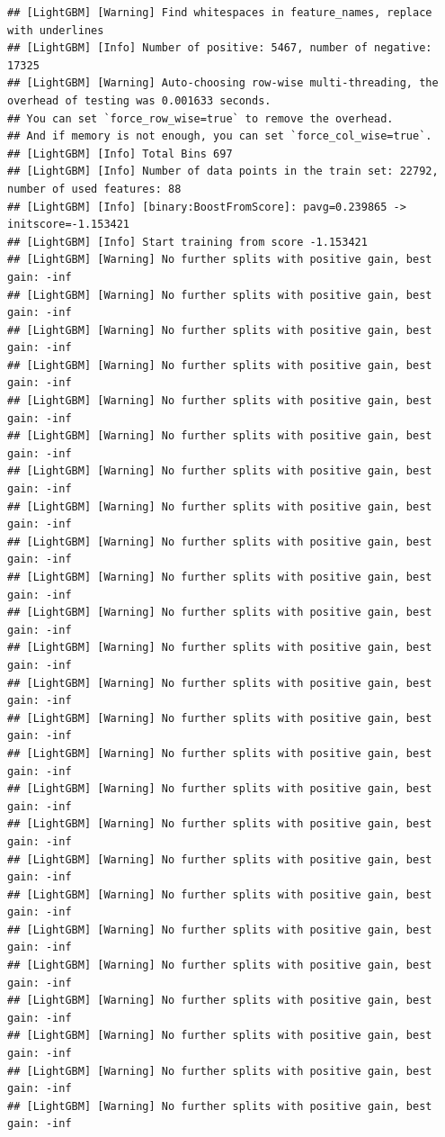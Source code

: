 \documentclass[
]{book}
\begin{document}
\begin{verbatim}
## [LightGBM] [Warning] Find whitespaces in feature_names, replace with underlines
## [LightGBM] [Info] Number of positive: 5467, number of negative: 17325
## [LightGBM] [Warning] Auto-choosing row-wise multi-threading, the overhead of testing was 0.001633 seconds.
## You can set `force_row_wise=true` to remove the overhead.
## And if memory is not enough, you can set `force_col_wise=true`.
## [LightGBM] [Info] Total Bins 697
## [LightGBM] [Info] Number of data points in the train set: 22792, number of used features: 88
## [LightGBM] [Info] [binary:BoostFromScore]: pavg=0.239865 -> initscore=-1.153421
## [LightGBM] [Info] Start training from score -1.153421
## [LightGBM] [Warning] No further splits with positive gain, best gain: -inf
## [LightGBM] [Warning] No further splits with positive gain, best gain: -inf
## [LightGBM] [Warning] No further splits with positive gain, best gain: -inf
## [LightGBM] [Warning] No further splits with positive gain, best gain: -inf
## [LightGBM] [Warning] No further splits with positive gain, best gain: -inf
## [LightGBM] [Warning] No further splits with positive gain, best gain: -inf
## [LightGBM] [Warning] No further splits with positive gain, best gain: -inf
## [LightGBM] [Warning] No further splits with positive gain, best gain: -inf
## [LightGBM] [Warning] No further splits with positive gain, best gain: -inf
## [LightGBM] [Warning] No further splits with positive gain, best gain: -inf
## [LightGBM] [Warning] No further splits with positive gain, best gain: -inf
## [LightGBM] [Warning] No further splits with positive gain, best gain: -inf
## [LightGBM] [Warning] No further splits with positive gain, best gain: -inf
## [LightGBM] [Warning] No further splits with positive gain, best gain: -inf
## [LightGBM] [Warning] No further splits with positive gain, best gain: -inf
## [LightGBM] [Warning] No further splits with positive gain, best gain: -inf
## [LightGBM] [Warning] No further splits with positive gain, best gain: -inf
## [LightGBM] [Warning] No further splits with positive gain, best gain: -inf
## [LightGBM] [Warning] No further splits with positive gain, best gain: -inf
## [LightGBM] [Warning] No further splits with positive gain, best gain: -inf
## [LightGBM] [Warning] No further splits with positive gain, best gain: -inf
## [LightGBM] [Warning] No further splits with positive gain, best gain: -inf
## [LightGBM] [Warning] No further splits with positive gain, best gain: -inf
## [LightGBM] [Warning] No further splits with positive gain, best gain: -inf
## [LightGBM] [Warning] No further splits with positive gain, best gain: -inf

\end{verbatim}
\end{document}

